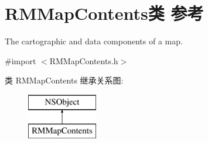 \hypertarget{interface_r_m_map_contents}{\section{R\-M\-Map\-Contents类 参考}
\label{interface_r_m_map_contents}
}


The cartographic and data components of a map.  




{\ttfamily \#import $<$R\-M\-Map\-Contents.\-h$>$}

类 R\-M\-Map\-Contents 继承关系图\-:\begin{figure}[H]
\begin{center}
\leavevmode
\includegraphics[height=2.000000cm]{interface_r_m_map_contents}
\end{center}
\end{figure}
